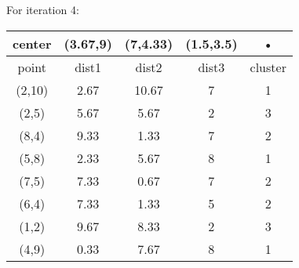 \documentclass[paper=a4, fontsize=13pt]{article} %
\begin{document}
\\
\\
For iteration 4:\\
\begin{tabular}{|c|c|c|c|c|}
\hline 
center & (3.67,9) & (7,4.33) & (1.5,3.5) & • \\ 
\hline 
point & dist1 & dist2 & dist3 & cluster \\ 
\hline 
(2,10) & 2.67 & 10.67 & 7 & 1 \\ 
\hline 
(2,5) & 5.67 & 5.67 & 2 & 3 \\ 
\hline 
(8,4) & 9.33 & 1.33 & 7 & 2 \\ 
\hline 
(5,8) & 2.33 & 5.67 & 8 & 1 \\ 
\hline 
(7,5) & 7.33 & 0.67 & 7 & 2 \\ 
\hline 
(6,4) & 7.33 & 1.33 & 5 & 2 \\ 
\hline 
(1,2) & 9.67 & 8.33 & 2 & 3 \\ 
\hline 
(4,9) & 0.33 & 7.67 & 8 & 1 \\ 
\hline 
\end{tabular} 
\\
\\

\end{document}
